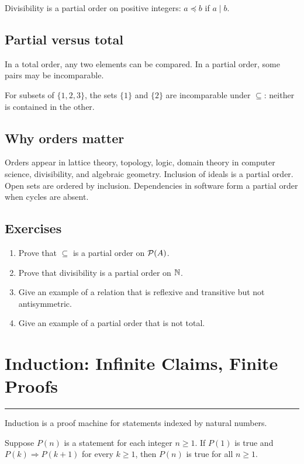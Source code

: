 \documentclass[12pt]{article}
\newcommand{\chapterline}{\vspace{0.4em}\hrule\vspace{0.8em}}
\begin{document}
Divisibility is a partial order on positive integers: $a\preceq b$ if $a\mid b$.

\subsection{Partial versus total}

In a total order, any two elements can be compared. In a partial order, some pairs may be incomparable.

For subsets of $\{1,2,3\}$, the sets $\{1\}$ and $\{2\}$ are incomparable under $\subseteq$: neither is contained in the other.

\subsection{Why orders matter}

Orders appear in lattice theory, topology, logic, domain theory in computer science, divisibility, and algebraic geometry. Inclusion of ideals is a partial order. Open sets are ordered by inclusion. Dependencies in software form a partial order when cycles are absent.

\subsection{Exercises}

\begin{enumerate}
\item Prove that $\subseteq$ is a partial order on $\mathcal{P}(A)$.
\item Prove that divisibility is a partial order on $\mathbb{N}$.
\item Give an example of a relation that is reflexive and transitive but not antisymmetric.
\item Give an example of a partial order that is not total.
\end{enumerate}

\newpage
\section{Induction: Infinite Claims, Finite Proofs}
\chapterline

Induction is a proof machine for statements indexed by natural numbers.

\begin{theorem}[Induction]
Suppose $P(n)$ is a statement for each integer $n\geq1$. If $P(1)$ is true and $P(k)\Rightarrow P(k+1)$ for every $k\geq1$, then $P(n)$ is true for all $n\geq1$.
\end{theorem}
\end{document}
